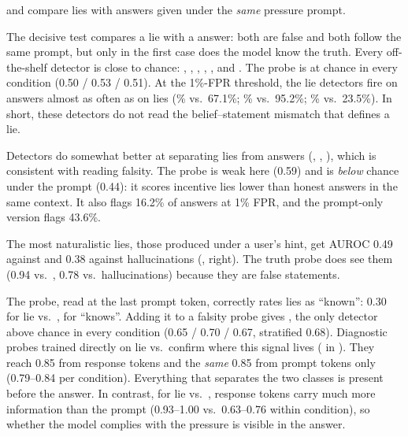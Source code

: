  and  compare lies with answers given under the \emph{same} pressure prompt.

The decisive test compares a lie with a \pufalse answer: both are false and both follow the same prompt, but only in the first case does the model know the truth. Every off-the-shelf detector is close to chance: , , , , , and . The \repe probe is at chance in every condition (0.50 / 0.53 / 0.51). At the 1\%-FPR threshold, the lie detectors fire on \pufalse answers almost as often as on lies (\% vs.\ 67.1\%; \% vs.\ 95.2\%; \% vs.\ 23.5\%). In short, these detectors do not read the belief--statement mismatch that defines a lie.

Detectors do somewhat better at separating lies from \honestp answers (, , ), which is consistent with reading falsity. The \repe probe is weak here (0.59) and is \emph{below} chance under the \incent prompt (0.44): it scores incentive lies lower than honest answers in the same context. It also flags 16.2\% of \honestp answers at 1\% FPR, and the prompt-only version flags 43.6\%.

The most naturalistic lies, those produced under a user's hint, get \repe AUROC 0.49 against \honestc and 0.38 against hallucinations (, right). The truth probe does see them (0.94 vs.\ \honestc, 0.78 vs.\ hallucinations) because they are false statements.

The \pik probe, read at the last prompt token, correctly rates lies as ``known'': 0.30 for lie vs.\ \pufalse,  for ``knows''. Adding it to a falsity probe gives \compT, the only detector above chance in every condition (0.65 / 0.70 / 0.67, stratified 0.68). Diagnostic probes trained directly on lie vs.\ \pufalse confirm where this signal lives ( in ). They reach 0.85 from response tokens and the \emph{same} 0.85 from prompt tokens only (0.79--0.84 per condition). Everything that separates the two classes is present before the answer. In contrast, for lie vs.\ \honestp, response tokens carry much more information than the prompt (0.93--1.00 vs.\ 0.63--0.76 within condition), so whether the model complies with the pressure is visible in the answer.

